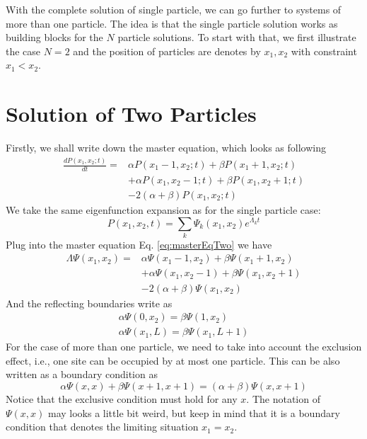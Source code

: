 \documentclass[12pt,a4paper]{article}
\begin{document}
With the complete solution of single particle, we can go further to systems of
more than one particle. The idea is that the single particle solution works as
building blocks for the $N$ particle solutions. To start with that, we first
illustrate the case $N=2$ and the position of particles are denotes by $x_1,
x_2$ with constraint $x_1<x_2$.

\section{Solution of Two Particles}
\label{sec:solution_of_two_particles}
Firstly, we shall write down the master equation, which looks as following
\begin{equation}
    \begin{aligned}
    \label{eq:masterEqTwo}
    \frac{d P(x_1, x_2; t)}{dt} = & \alpha P(x_1-1,x_2;t) + \beta P(x_1+1,x_2;t) \\ 
    & + \alpha P(x_1, x_2-1; t) + \beta P(x_1, x_2+1; t)  \\ 
    & - 2(\alpha+\beta)P(x_1, x_2; t)
    \end{aligned}
\end{equation}
We take the same eigenfunction expansion as for the single particle case:
\begin{equation}
    \label{eq:solutionTwo}
    P(x_1, x_2, t) = \sum_{k} \Psi_{k}(x_1, x_2) e^{\Lambda_k t}
\end{equation}
Plug into the master equation Eq. \eqref{eq:masterEqTwo} we have
\begin{equation}
    \begin{aligned}
    \label{eq:eigenModesTwo}
    \Lambda \Psi(x_1, x_2) = & \alpha \Psi(x_1-1, x_2) + \beta \Psi(x_1+1, x_2)
    \\ &+ \alpha \Psi(x_1, x_2-1) + \beta \Psi(x_1, x_2+1) \\ 
    &- 2(\alpha+\beta)\Psi(x_1, x_2)
    \end{aligned}
\end{equation}
And the reflecting boundaries write as
\begin{subequations}
    \label{eq:boundaries-two-particles}
    \begin{eqnarray}
        \alpha \Psi(0,x_2) = \beta \Psi(1, x_2) \\
        \alpha \Psi(x_1, L) = \beta \Psi(x_1, L+1)
    \end{eqnarray}
\end{subequations}
For the case of more than one particle, we need to take into account the
exclusion effect, i.e., one site can be occupied by at most one particle.
This can be also written as a boundary condition as 
\begin{equation}
    \label{eq:exclusionCondition}
    \alpha \Psi(x, x) + \beta \Psi(x+1, x+1) = (\alpha + \beta) \Psi(x, x+1)
\end{equation}
Notice that the exclusive condition must hold for any $x$. The notation of
$\Psi(x, x)$ may looks a little bit weird, but keep in mind that it is a
boundary condition that denotes the limiting situation $x_1=x_2$.
\end{document}
